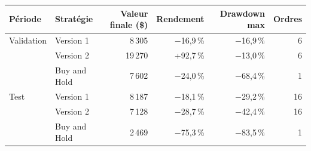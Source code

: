 \begin{tabular}{llrrrr}\toprule
Période & Stratégie & Valeur finale (\$) & Rendement & Drawdown max & Ordres \\\midrule
Validation & Version 1 & 8\,305 & $-$16,9\,\% & $-$16,9\,\% & 6 \\
 & Version 2 & 19\,270 & +92,7\,\% & $-$13,0\,\% & 6 \\
 & Buy and Hold & 7\,602 & $-$24,0\,\% & $-$68,4\,\% & 1 \\
\addlinespace
Test & Version 1 & 8\,187 & $-$18,1\,\% & $-$29,2\,\% & 16 \\
 & Version 2 & 7\,128 & $-$28,7\,\% & $-$42,4\,\% & 16 \\
 & Buy and Hold & 2\,469 & $-$75,3\,\% & $-$83,5\,\% & 1 \\
\bottomrule\end{tabular}
